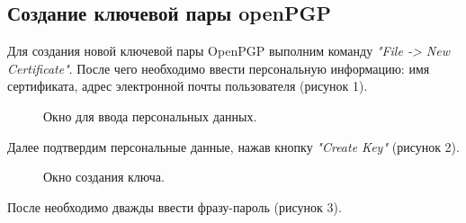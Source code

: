 \documentclass[10pt,a4paper]{report}
\begin{document}
\subsection{Создание  ключевой пары openPGP}
Для создания новой ключевой пары OpenPGP выполним команду \textit{"File -> New Certificate"}. После чего необходимо ввести персональную информацию: имя сертификата, адрес электронной почты пользователя (рисунок 1).
\begin{figure}[ht]
	\caption{Окно для ввода персональных данных.}
\end{figure}


Далее подтвердим персональные данные, нажав кнопку \textit{"Create Key"} (рисунок 2).
\begin{figure}[ht]
	\caption{Окно создания ключа.}
\end{figure}

После необходимо дважды ввести фразу-пароль (рисунок 3).
\end{document}
